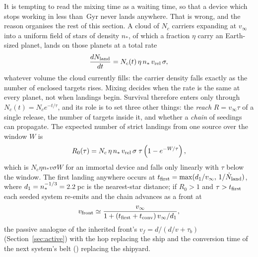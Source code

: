 \documentclass[11pt]{article}
\begin{document}
It is tempting to read the mixing time as a waiting time, so that a device
which stops working in less than \AnnulusFillGyr\,Gyr never lands anywhere.
That is wrong, and the reason organises the rest of this section.  A cloud of
$N_{c}$ carriers expanding at $v_\infty$ into a uniform field of stars of
density $n_{*}$, of which a fraction $\eta$ carry an Earth-sized planet, lands
on those planets at a total rate
\begin{equation}
\frac{dN_{\rm land}}{dt}=N_{c}(t)\,\eta\,n_{*}\,v_{\rm rel}\,\sigma ,
\label{eq:landrate}
\end{equation}
whatever volume the cloud currently fills: the carrier density falls exactly
as the number of enclosed targets rises.  Mixing decides when the rate is the
same at every planet, not when landings begin.  Survival therefore enters
only through $N_{c}(t)=N_{c}e^{-t/\tau}$, and its role is to set three other
things: the \emph{reach} $R=v_\infty\tau$ of a single release, the number of
targets inside it, and whether a \emph{chain} of seedings can propagate.  The
expected number of strict landings from one source over the window $W$ is
\begin{equation}
R_{0}(\tau)=N_{c}\,\eta\,n_{*}\,v_{\rm rel}\,\sigma\;\tau\left(1-e^{-W/\tau}\right),
\label{eq:r0tau}
\end{equation}
which is $N_{c}\eta n_{*}v\sigma W$ for an immortal device and falls only
linearly with $\tau$ below the window.  The first landing anywhere occurs at
$t_{\rm first}=\max(d_{1}/v_\infty,\,1/\dot N_{\rm land})$, where
$d_{1}=n_{*}^{-1/3}=2.2$\,pc is the nearest-star distance; if
$R_{0}>1$ and $\tau>t_{\rm first}$ each seeded system re-emits and the chain
advances as a front at
\begin{equation}
v_{\rm front}\simeq\frac{v_\infty}{1+(t_{\rm first}+t_{\rm conv})\,v_\infty/d_{1}},
\end{equation}
the passive analogue of the inherited front's $v_f=d/(d/v+\tau_b)$
(Section~\ref{sec:active}) with the hop replacing the ship and the conversion
time of the next system's belt (\BeltConvTime) replacing the shipyard.
\end{document}
